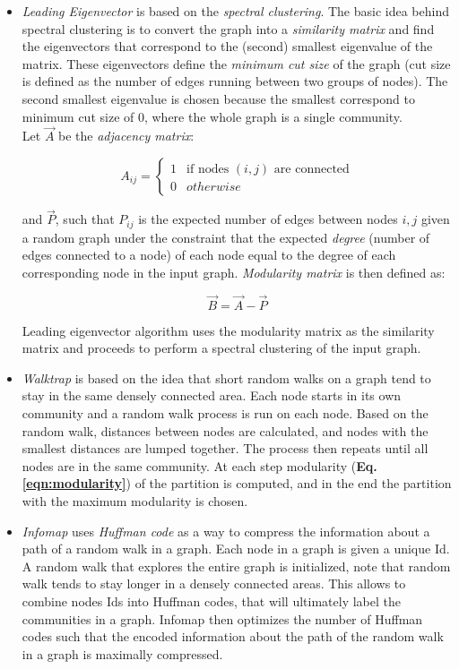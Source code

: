 \begin{itemize}
\item \textit{Leading Eigenvector}\cite{Newman_2006} is based on the \textit{spectral clustering}. The basic idea behind spectral clustering is to convert the graph into a \textit{similarity matrix} and find the eigenvectors that correspond to the (second) smallest eigenvalue of the matrix. These eigenvectors define the \textit{minimum cut size} of the graph (cut size is defined as the number of edges running between two groups of nodes). The second smallest eigenvalue is chosen because the smallest correspond to minimum cut size of 0, where the whole graph is a single community.\\
Let $\vec{A}$ be the  \textit{adjacency matrix}:

\begin{equation}
\label{eqn:adj_matrix}
A_{ij}=
\begin{cases}
	1 & \text{if nodes $(i,j)$ are connected}\\
	0 & otherwise
\end{cases}
\end{equation}

and $\vec{P}$, such that $P_{ij}$ is the expected number of edges between nodes $i,j$ given a random graph under the constraint that the expected \textit{degree} (number of edges connected to a node) of each node equal to the degree of each corresponding node in the input graph. \textit{Modularity matrix} is then defined as:

\begin{equation}
\label{eqn:modularity_matrix}
\vec{B}=\vec{A}-\vec{P}
\end{equation}

Leading eigenvector algorithm uses the modularity matrix as the similarity matrix and proceeds to perform a spectral clustering of the input graph.

\item \textit{Walktrap}\cite{Pons_2006} is based on the idea that short random walks on a graph tend to stay in the same densely connected area. Each node starts in its own community and a random walk process is run on each node. Based on the random walk, distances between nodes are calculated, and nodes with the smallest distances are lumped together. The process then repeats until all nodes are in the same community. At each step modularity (\textbf{Eq. \eqref{eqn:modularity}}) of the partition is computed, and in the end the partition with the maximum modularity is chosen.

\item \textit{Infomap}\cite{Rosvall_2009} uses \textit{Huffman code} as a way to compress the information about a path of a random walk in a graph.
Each node in a graph is given a unique Id. A random walk that explores the entire graph is initialized, note that random walk tends to stay longer in a densely connected areas. This allows to combine nodes Ids into Huffman codes, that will ultimately label the communities in a graph. Infomap then optimizes the number of Huffman codes such that the encoded information about the path of the random walk in a graph is maximally compressed.


\end{itemize}
